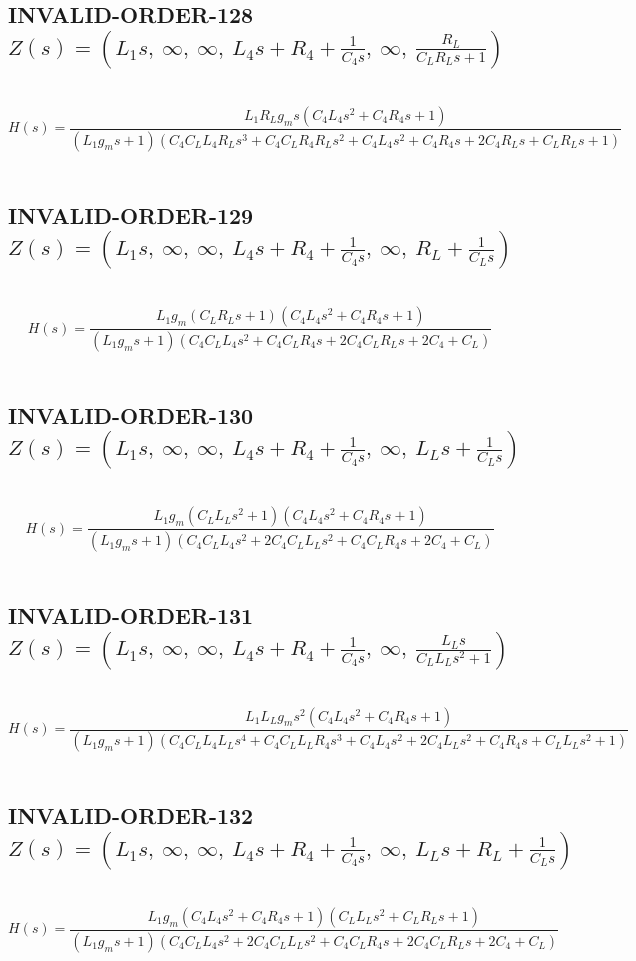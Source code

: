 \documentclass{article}
\begin{document}
\subsection{INVALID-ORDER-128 $Z(s) = \left( L_{1} s, \  \infty, \  \infty, \  L_{4} s + R_{4} + \frac{1}{C_{4} s}, \  \infty, \  \frac{R_{L}}{C_{L} R_{L} s + 1}\right)$ } \ 
\textbf{\[H(s) = \frac{L_{1} R_{L} g_{m} s \left(C_{4} L_{4} s^{2} + C_{4} R_{4} s + 1\right)}{\left(L_{1} g_{m} s + 1\right) \left(C_{4} C_{L} L_{4} R_{L} s^{3} + C_{4} C_{L} R_{4} R_{L} s^{2} + C_{4} L_{4} s^{2} + C_{4} R_{4} s + 2 C_{4} R_{L} s + C_{L} R_{L} s + 1\right)}\] } \ 
\subsection{INVALID-ORDER-129 $Z(s) = \left( L_{1} s, \  \infty, \  \infty, \  L_{4} s + R_{4} + \frac{1}{C_{4} s}, \  \infty, \  R_{L} + \frac{1}{C_{L} s}\right)$ } \ 
\textbf{\[H(s) = \frac{L_{1} g_{m} \left(C_{L} R_{L} s + 1\right) \left(C_{4} L_{4} s^{2} + C_{4} R_{4} s + 1\right)}{\left(L_{1} g_{m} s + 1\right) \left(C_{4} C_{L} L_{4} s^{2} + C_{4} C_{L} R_{4} s + 2 C_{4} C_{L} R_{L} s + 2 C_{4} + C_{L}\right)}\] } \ 
\subsection{INVALID-ORDER-130 $Z(s) = \left( L_{1} s, \  \infty, \  \infty, \  L_{4} s + R_{4} + \frac{1}{C_{4} s}, \  \infty, \  L_{L} s + \frac{1}{C_{L} s}\right)$ } \ 
\textbf{\[H(s) = \frac{L_{1} g_{m} \left(C_{L} L_{L} s^{2} + 1\right) \left(C_{4} L_{4} s^{2} + C_{4} R_{4} s + 1\right)}{\left(L_{1} g_{m} s + 1\right) \left(C_{4} C_{L} L_{4} s^{2} + 2 C_{4} C_{L} L_{L} s^{2} + C_{4} C_{L} R_{4} s + 2 C_{4} + C_{L}\right)}\] } \ 
\subsection{INVALID-ORDER-131 $Z(s) = \left( L_{1} s, \  \infty, \  \infty, \  L_{4} s + R_{4} + \frac{1}{C_{4} s}, \  \infty, \  \frac{L_{L} s}{C_{L} L_{L} s^{2} + 1}\right)$ } \ 
\textbf{\[H(s) = \frac{L_{1} L_{L} g_{m} s^{2} \left(C_{4} L_{4} s^{2} + C_{4} R_{4} s + 1\right)}{\left(L_{1} g_{m} s + 1\right) \left(C_{4} C_{L} L_{4} L_{L} s^{4} + C_{4} C_{L} L_{L} R_{4} s^{3} + C_{4} L_{4} s^{2} + 2 C_{4} L_{L} s^{2} + C_{4} R_{4} s + C_{L} L_{L} s^{2} + 1\right)}\] } \ 
\subsection{INVALID-ORDER-132 $Z(s) = \left( L_{1} s, \  \infty, \  \infty, \  L_{4} s + R_{4} + \frac{1}{C_{4} s}, \  \infty, \  L_{L} s + R_{L} + \frac{1}{C_{L} s}\right)$ } \ 
\textbf{\[H(s) = \frac{L_{1} g_{m} \left(C_{4} L_{4} s^{2} + C_{4} R_{4} s + 1\right) \left(C_{L} L_{L} s^{2} + C_{L} R_{L} s + 1\right)}{\left(L_{1} g_{m} s + 1\right) \left(C_{4} C_{L} L_{4} s^{2} + 2 C_{4} C_{L} L_{L} s^{2} + C_{4} C_{L} R_{4} s + 2 C_{4} C_{L} R_{L} s + 2 C_{4} + C_{L}\right)}\] } \ 
\end{document}
